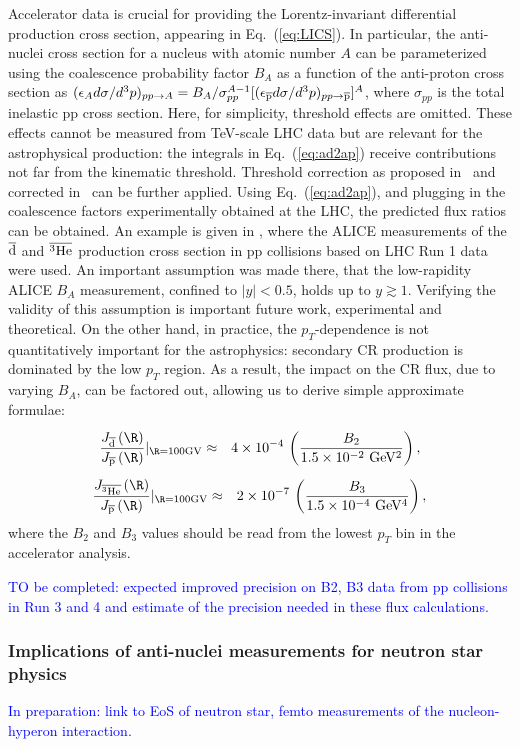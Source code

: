 Accelerator data is crucial for providing the Lorentz-invariant differential production cross section, appearing in Eq.~(\ref{eq:LICS}). 
In particular, the anti-nuclei cross section for a nucleus with atomic number $A$ can be parameterized using the coalescence probability factor $B_A$ as a function of the anti-proton cross section as 
$(\epsilon_A d\sigma/d^3p)_{pp\to A} = B_A/\sigma_{pp}^{A-1} [(\epsilon_{\overline{\rm p}} d\sigma/d^3p)_{pp\to \overline{\rm p}}]^A$, 
where $\sigma_{pp}$ is the total inelastic pp cross section. 
Here, for simplicity, threshold effects are omitted. 
These effects cannot be measured from TeV-scale LHC data but are relevant for the astrophysical production: the integrals in Eq.~(\ref{eq:ad2ap}) receive contributions not far from the kinematic threshold. 
Threshold correction as proposed in~\cite{Duperray:2002pj,Duperray:2003tv} and corrected in~\cite{Blum:2017qnn} can be further applied. 
%
Using Eq.~(\ref{eq:ad2ap}), and plugging in the coalescence factors experimentally obtained at the LHC, the predicted flux ratios can be obtained. 
An example is given in \cite{Blum:2017qnn}, where the ALICE measurements of the $\overline{\rm d}$ and $\overline{^3\rm He}$ production cross section in pp collisions based on LHC Run 1 data ~\cite{Acharya:2017fvb} were used. 
An important assumption was made there, that the low-rapidity ALICE $B_A$ measurement, confined to $|y|<0.5$, holds up to $y\gtrsim1$. Verifying the validity of this assumption is important future work, experimental and theoretical.
On the other hand, in practice, the $p_T$-dependence is not quantitatively important for the astrophysics: secondary CR production is dominated by the low $p_T$ region. As a result, the impact on the CR flux, due to varying $B_A$, can be factored out, allowing us to derive simple approximate formulae:
%
 \begin{eqnarray}\label{eq:J2}\frac{J_{\overline{\rm d}}\left(\R\right)}{J_{\overline{\rm p}}\left(\R\right)}\huge|_{\R=100{\rm GV}}&\approx&4\times10^{-4}\,\left(\frac{B_2}{1.5\times10^{-2}~\rm GeV^2}\right),\end{eqnarray}
%
%
 \begin{eqnarray}\label{eq:J3}\frac{J_{\overline{^3\rm He}}\left(\R\right)}{J_{\overline{\rm p}}\left(\R\right)}\huge|_{\R=100{\rm GV}}&\approx&2\times10^{-7}\,\left(\frac{B_3}{1.5\times10^{-4}~\rm GeV^4}\right),\end{eqnarray}
%
where the $B_2$ and $B_3$ values should be read from the lowest $p_T$ bin in the accelerator analysis. 
%

\textcolor{blue}{TO be completed: expected improved precision on B2, B3 data from pp collisions in Run 3 and 4 and estimate of the precision needed in these flux calculations.}

\subsubsection{Implications of anti-nuclei measurements for neutron star physics}
\textcolor{blue}{In preparation: link to EoS of neutron star, femto measurements of the nucleon-hyperon interaction.}
